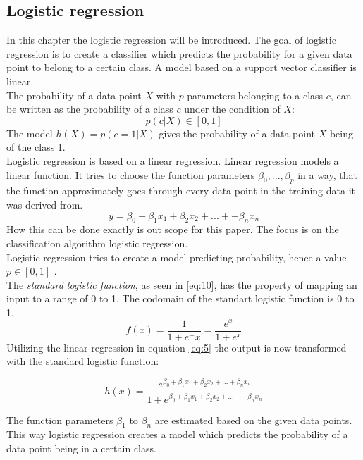 \subsection{Logistic regression}
In this chapter the logistic regression will be introduced. The goal of logistic regression is to create a classifier which predicts the probability for a given data point  to belong to a certain class. A model based on a support vector classifier is linear.
\\

The probability of a data point $X$ with $p$ parameters belonging to a class $c$, can be written as the probability of a class $c$ under the condition of $X$:
\begin{equation} \label{eq:4}
p(c|X) \in [0,1]
\end{equation}
The model $h(X)=p(c=1|X)$ gives the probability of a data point $X$ being of the class 1.
\\

Logistic regression is based on a linear regression. Linear regression models a linear function. It tries to choose the function parameters $\beta_0, ..., \beta_p$ in a way,  that the function approximately goes through every data point in the training data it was derived from.
\begin{equation} \label{eq:5}
y=\beta_0 + \beta_1 x_1 + \beta_2 x_2 + ... + + \beta_n x_n
\end{equation}
How this can be done exactly is out scope for this paper. The focus is on the classification algorithm logistic regression.\\
Logistic regression tries to create a model predicting probability, hence a value $p \in [0,1]$ . \\
The \emph{standard logistic function}, as seen in \ref{eq:10}, has the property of mapping an input to a range of 0 to 1. The codomain of the standart logistic function is 0 to 1.
\begin{equation} \label{eq:10}
f(x)=\frac{1}{1+e^-x}=\frac{e^x}{1+e^x}
\end{equation}
Utilizing the linear regression in equation \ref{eq:5} the output is now transformed with the standard logistic function:

\begin{equation} \label{eq:11}
h(x)=\frac{e^{\beta_0 + \beta_1 x_1 + \beta_2 x_2 + ... + \beta_n x_n}}{1+e^{\beta_0 + \beta_1 x_1 + \beta_2 x_2 + ... + + \beta_n x_n}}
\end{equation}

The function parameters $\beta_1$ to  $\beta_n$ are estimated based on the given data points.  \\
This way logistic regression creates a model which predicts the probability of a data point being in a certain class. \cite{cox1958regression}

